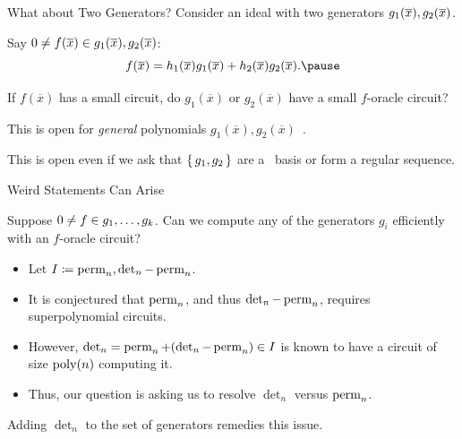 \documentclass[aspectratio=169]{beamer}
\begin{document}
\begin{frame}{What about Two Generators?}
  Consider an ideal with two generators $\ideal{g_1(\overline{x}), g_2(\overline{x})}$.

  \pause

  Say $0 \neq f(\overline{x}) \in \ideal{g_1(\overline{x}), g_2(\overline{x})}$: \pause
  \[
    f(\overline{x}) = h_1(\overline{x}) g_1(\overline{x}) + h_2(\overline{x}) g_2(\overline{x}). \pause
  \]
  \begin{question}
    If $f(\overline{x})$ has a small circuit, do $g_1(\overline{x})$ or $g_2(\overline{x})$ have a small $f$-oracle circuit?
  \end{question}

  \pause

  This is open for \emph{general} polynomials $g_1(\overline{x}), g_2(\overline{x})$~\cite{Gro20}.

  \pause

  This is open even if we ask that $\set{g_1, g_2}$ are a \Grobner\ basis or form a regular sequence.
\end{frame}

\begin{frame}{Weird Statements Can Arise}
  \begin{question}
    Suppose $0 \neq f \in \ideal{g_1, \ldots, g_k}$.
    Can we compute any of the generators $g_i$ efficiently with an $f$-oracle circuit?
  \end{question}

  \pause

  \begin{ex}
    \begin{itemize}
    \item Let $I \defeq \ideal{\perm_n, \det_n - \perm_n}$.\ \pause
    \item It is conjectured that $\operatorname{perm}_n$, and thus $\det_n - \operatorname{perm}_n$, requires superpolynomial circuits.\ \pause
    \item However, $\det_n = \operatorname{perm}_n + (\det_n - \operatorname{perm}_n) \in I$ is known to have a circuit of size $\operatorname{poly}(n)$ computing it.\ \pause
    \item Thus, our question is asking us to resolve $\det_n$ versus $\operatorname{perm}_n$.
    \end{itemize}
  \end{ex}

  Adding $\det_n$ to the set of generators remedies this issue.
\end{frame}
\end{document}

